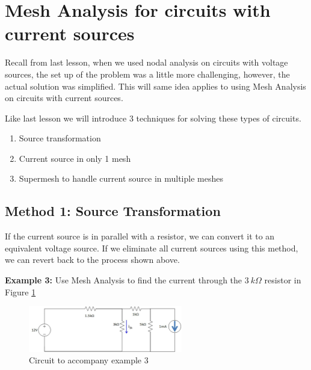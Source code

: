 \documentclass{handout}
\begin{document}
\newpage
\clearpage
\pagebreak

\section{Mesh Analysis for circuits with current sources}
Recall from last lesson, when we used nodal analysis on circuits with voltage sources, the set up of the problem was a little more challenging, however, the actual solution was simplified.  This will same idea applies to using Mesh Analysis on circuits with current sources.

Like last lesson we will introduce 3 techniques for solving these types of circuits.

\begin{enumerate}
	\item Source transformation
	\item Current source in only 1 mesh
	\item Supermesh to handle current source in multiple meshes
\end{enumerate}

\subsection{Method 1: Source Transformation}
If the current source is in parallel with a resistor, we can convert it to an equivalent voltage source.  If we eliminate all current sources using this method, we can revert back to the process shown above.

\textbf{Example 3:} Use Mesh Analysis to find the current through the $3\ k\Omega$ resistor in Figure \ref{fig: MeshAnalysisEx3}
\begin{figure} [h t b]
\centering
\includegraphics[width=0.6\textwidth]{Example3.jpg}
\caption{Circuit to accompany example 3}
\label{fig: MeshAnalysisEx3}
\end{figure}

\end{document}
